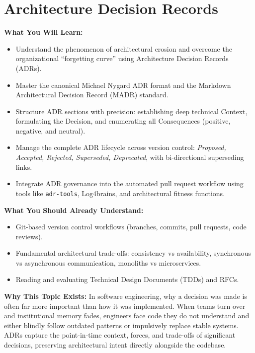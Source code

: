 \chapter{Architecture Decision Records}
\label{ch:adrs}

\begin{chaptergoalsbox}
\textbf{What You Will Learn:}
\begin{itemize}[leftmargin=12pt]
  \item Understand the phenomenon of architectural erosion and overcome the organizational ``forgetting curve'' using Architecture Decision Records (ADRs).
  \item Master the canonical Michael Nygard ADR format and the Markdown Architectural Decision Record (MADR) standard.
  \item Structure ADR sections with precision: establishing deep technical Context, formulating the Decision, and enumerating all Consequences (positive, negative, and neutral).
  \item Manage the complete ADR lifecycle across version control: \textit{Proposed, Accepted, Rejected, Superseded, Deprecated}, with bi-directional superseding links.
  \item Integrate ADR governance into the automated pull request workflow using tools like \texttt{adr-tools}, Log4brains, and architectural fitness functions.
\end{itemize}

\textbf{What You Should Already Understand:}
\begin{itemize}[leftmargin=12pt]
  \item Git-based version control workflows (branches, commits, pull requests, code reviews).
  \item Fundamental architectural trade-offs: consistency vs availability, synchronous vs asynchronous communication, monoliths vs microservices.
  \item Reading and evaluating Technical Design Documents (TDDs) and RFCs.
\end{itemize}

\textbf{Why This Topic Exists:}
In software engineering, why a decision was made is often far more important than how it was implemented. When teams turn over and institutional memory fades, engineers face code they do not understand and either blindly follow outdated patterns or impulsively replace stable systems. ADRs capture the point-in-time context, forces, and trade-offs of significant decisions, preserving architectural intent directly alongside the codebase.


\end{chaptergoalsbox}
